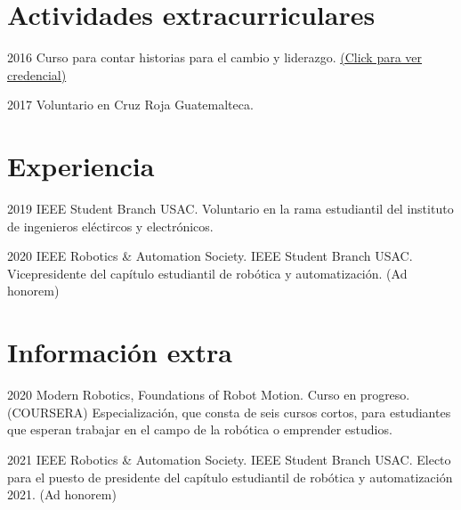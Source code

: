 \documentclass[]{twentysecondcv}
\begin{document}

\section{Actividades extracurriculares}

\begin{twentyshort}

	\twentyitemshort
    	{2016}
    	{Curso para contar historias para el cambio y liderazgo. \href{https://www.coursera.org/account/accomplishments/verify/HG4MHZYP8JXW}{(Click para ver credencial)}}
    
	\twentyitemshort
    	{2017}
    	{Voluntario en Cruz Roja Guatemalteca.}   
    	
\end{twentyshort}



\section{Experiencia}

\begin{twenty}

	\twentyitem
    	{2019}
    	{ }
    	{IEEE Student Branch USAC.}
    	{Voluntario en la rama estudiantil del instituto de ingenieros el\'ectircos y electr\'onicos.}
    	
    	
	\twentyitem
    	{2020}
    	{IEEE Robotics \& Automation Society.}
    	{IEEE Student Branch USAC.}
    	{Vicepresidente del cap\'itulo estudiantil de rob\'otica y automatizaci\'on. (Ad honorem)}
    
\end{twenty}

\section{Informaci\'on extra}

\begin{twenty}

	\twentyitem
    	{2020}
    	{Modern Robotics, Foundations of Robot Motion.}
    	{Curso en progreso. (COURSERA)}
    	{Especializaci\'on, que consta de seis cursos cortos, para estudiantes que esperan trabajar en el campo de la rob\'otica o emprender estudios.}

	\twentyitem
    	{2021}
    	{IEEE Robotics \& Automation Society.}
    	{IEEE Student Branch USAC.}
    	{Electo para el puesto de presidente del cap\'itulo estudiantil de rob\'otica y automatizaci\'on 2021. (Ad honorem)}
    	
    
\end{twenty}
\end{document}
